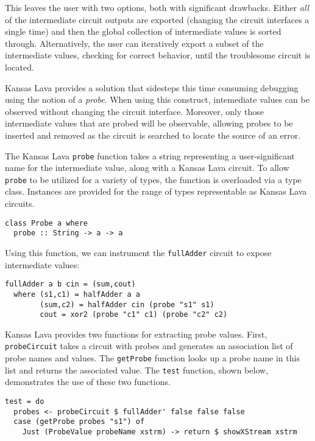 \documentclass{llncs}
\begin{document}
This leaves the user with two options, both with
significant drawbacks. Either \emph{all} of the intermediate circuit outputs are
exported (changing the circuit interfaces a single time) and then the global
collection of intermediate values is sorted through. Alternatively, the user can
iteratively export a subset of the intermediate values, checking for correct
behavior, until the troublesome circuit is located.

Kansas Lava provides a solution that sidesteps this time consuming debugging
using the notion of a \emph{probe}. When using this construct,
intemediate values can be observed without changing the circuit
interface. Moreover, only those intermediate values that are probed will be
observable, allowing probes to be inserted and removed as the circuit is
searched to locate the source of an error.

The Kansas Lava \verb!probe! function takes a string representing a
user-significant name for the intermediate value, along with a Kansas Lava
circuit. To allow \verb!probe! to be utilized for a variety of types, the
function is overloaded via a type class. Instances are provided for the range of
types representable as Kansas Lava circuits.

\begin{verbatim}
class Probe a where
  probe :: String -> a -> a
\end{verbatim}

Using this function, we can instrument the \verb!fullAdder! circuit to expose
intermediate values:

\begin{verbatim}
fullAdder a b cin = (sum,cout)
  where (s1,c1) = halfAdder a a
        (sum,c2) = halfAdder cin (probe "s1" s1)
        cout = xor2 (probe "c1" c1) (probe "c2" c2)
\end{verbatim}

Kansas Lava provides two functions for extracting probe %
values. First, \verb!probeCircuit! takes a circuit with probes and generates an
association list of probe names and values. The \verb!getProbe! function looks
up a probe name in this list and returns the associated value. The \verb!test!
function, shown below, demonstrates the use of these two functions.

\begin{verbatim}
test = do
  probes <- probeCircuit $ fullAdder' false false false
  case (getProbe probes "s1") of
    Just (ProbeValue probeName xstrm) -> return $ showXStream xstrm
\end{verbatim}
\end{document}
